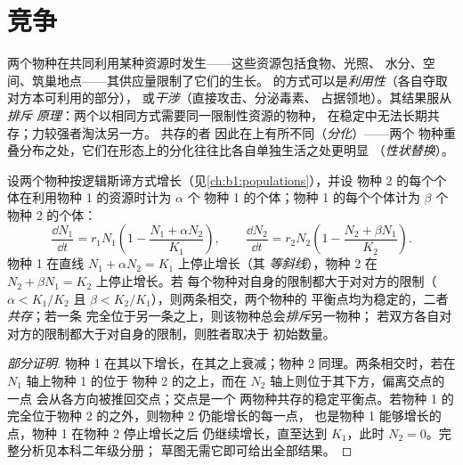 \section{竞争}

\begin{definition}[种间竞争]\label{def:b1:species-interactions:competition}
两个物种在共同利用某种资源时发生——这些资源包括食物、光照、
水分、空间、筑巢地点——其供应量限制了它们的生长。
的方式可以是\emph{利用性}（各自夺取对方本可利用的部分），
或\emph{干涉}（直接攻击、分泌毒素、
占据领地）。其结果服从\emph{排斥
原理}：两个以相同方式需要同一限制性资源的物种，
在稳定中无法长期共存；力较强者淘汰另一方。
共存的者
因此在上有所不同（\emph{分化}）——两个
物种重叠分布之处，它们在形态上的分化往往比各自单独生活之处更明显
（\emph{性状替换}）。
\end{definition}

\begin{proposition}\label{prop:b1:species-interactions:lotka}
设两个物种按逻辑斯谛方式增长（见\cref{ch:b1:populations}），并设
物种 2 的每个个体在利用物种 1 的资源时计为 $\alpha$ 个
物种 1 的个体；物种 1 的每个个体计为 $\beta$ 个
物种 2 的个体：
\[
\frac{\dd N_1}{\dd t} = r_1 N_1\left(1 - \frac{N_1 + \alpha N_2}{K_1}\right),
\qquad
\frac{\dd N_2}{\dd t} = r_2 N_2\left(1 - \frac{N_2 + \beta N_1}{K_2}\right).
\]
物种 1 在直线 $N_1 + \alpha N_2 = K_1$ 上停止增长（其
\emph{等斜线}），物种 2 在 $N_2 + \beta N_1 = K_2$ 上停止增长。若
每个物种对自身的限制都大于对对方的限制（$\alpha <
K_1/K_2$ 且 $\beta < K_2/K_1$），则两条相交，两个物种的
平衡点均为稳定的，二者\emph{共存}；若一条
完全位于另一条之上，则该物种总会\emph{排斥}另一物种；
若双方各自对对方的限制都大于对自身的限制，则胜者取决于
初始数量。
\end{proposition}
\begin{proof}[部分证明]
物种 1 在其以下增长，在其之上衰减；物种 2
同理。两条相交时，若在 $N_1$ 轴上物种 1 的位于
物种 2 的之上，而在 $N_2$ 轴上则位于其下方，偏离交点的一点
会从各方向被推回交点；交点是一个
两物种共存的稳定平衡点。若物种 1 的
完全位于物种 2 的之外，则物种 2 仍能增长的每一点，
也是物种 1 能够增长的点，物种 1 在物种 2 停止增长之后
仍继续增长，直至达到 $K_1$，此时
$N_2 = 0$。完整分析见本科二年级分册；
草图无需它即可给出全部结果。
\end{proof}

